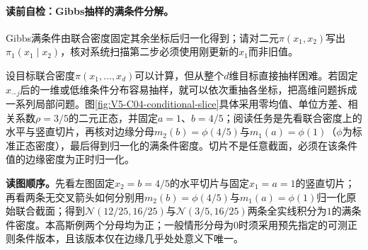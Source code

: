 \paragraph{读前自检：Gibbs抽样的满条件分解。}Gibbs满条件由联合密度固定其余坐标后归一化得到；请对二元$\pi(x_1,x_2)$写出$\pi_1(x_1\mid x_2)$，核对系统扫描第二步必须使用刚更新的$x_1$而非旧值。\par

\label{struct:V5-C04-CH06}
设目标联合密度$\pi(x_1,\ldots,x_d)$可以计算，但从整个$d$维目标直接抽样困难。若固定$x_{-j}$后的一维或低维条件分布容易抽样，就可以依次重抽各坐标，把高维问题拆成一系列局部问题。图\ref{fig:V5-C04-conditional-slice}具体采用零均值、单位方差、相关系数$\rho=3/5$的二元正态，并固定$a=1$、$b=4/5$；阅读任务是先看联合密度上的水平与竖直切片，再核对边缘分母$m_2(b)=\phi(4/5)$与$m_1(a)=\phi(1)$（$\phi$为标准正态密度），最后得到归一化的满条件密度。切片不是任意截面，必须在该条件值的边缘密度为正时归一化。


\noindent\textbf{读图顺序。}先看左图固定$x_2=b=4/5$的水平切片与固定$x_1=a=1$的竖直切片；再看两条无交叉箭头如何分别用$m_2(b)=\phi(4/5)$与$m_1(a)=\phi(1)$归一化原始联合截面；得到$\mathcal N(12/25,16/25)$与$\mathcal N(3/5,16/25)$两条全实线积分为$1$的满条件密度。本高斯例两个分母均为正；一般情形分母为$0$时须采用预先指定的可测正则条件版本，且该版本仅在边缘几乎处处意义下唯一。\par
\FloatBarrier


